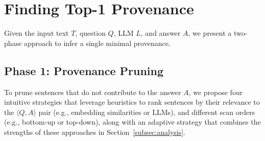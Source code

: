 \vspace{-1mm}
\section{Finding Top-1 Provenance}
\label{sec:1-provenance}

Given the input text $T$, question $Q$, LLM $L$, and answer $A$, we present a two-phase approach to infer a single minimal provenance. 



\subsection{Phase 1: Provenance Pruning} 
\label{subsec:phase1}
To prune sentences that do not contribute to the answer $A$, we propose four intuitive strategies that leverage heuristics to rank sentences by their relevance to the $\langle Q,A \rangle$ pair (e.g., embedding similarities or LLMs), and  different scan orders (e.g., bottom-up or top-down), along with an adaptive strategy that combines the strengths of these approaches in Section~\ref{subsec:analysis}. 


